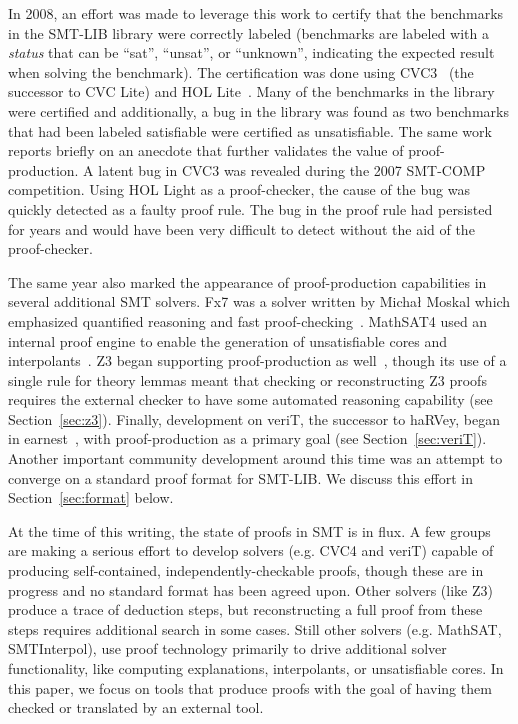 \documentclass{llncs}
\begin{document}
In 2008, an effort was made to leverage this work to certify that the
benchmarks in the SMT-LIB library were correctly labeled (benchmarks are
labeled with a \emph{status} that can be ``sat'', ``unsat'', or ``unknown'',
indicating the expected result when solving the benchmark).  The certification
was done using CVC3~\cite{BT07} (the successor to CVC Lite) and
HOL Lite~\cite{GB08}.  Many of the benchmarks in the library were certified and
additionally, a bug in the library was found as two benchmarks that had been
labeled satisfiable were certified as unsatisfiable.
The same work reports briefly on an anecdote that further validates the value
of proof-production.  A latent bug in CVC3 was revealed during the 2007
SMT-COMP competition.  Using HOL Light as a proof-checker, the cause of the bug
was quickly detected as a faulty proof rule.  The bug in the proof rule had
persisted for years and would have been very difficult to detect without the
aid of the proof-checker.

The same year also marked the appearance of proof-production capabilities in
several additional SMT solvers.  Fx7 was a solver written by Micha{\l} Moskal
which emphasized quantified reasoning and fast proof-checking~\cite{M08}.
MathSAT4 used an internal proof engine to enable the generation of
unsatisfiable cores and interpolants~\cite{BCF+08}.  Z3 began supporting
proof-production as well~\cite{dMB08}, though its use of a single rule for
theory lemmas meant that checking or reconstructing Z3 proofs requires the
external checker to have some automated reasoning capability (see
Section~\ref{sec:z3}).  Finally, development on veriT, the successor to haRVey,
began in earnest~\cite{BdOD+09}, with proof-production as a primary goal (see Section~\ref{sec:veriT}).
Another important community development around this time was an attempt to
converge on a standard proof format for SMT-LIB.  We discuss this effort in
Section~\ref{sec:format} below.

At the time of this writing, the state of proofs in SMT is in flux.  A few
groups are making a serious effort to develop solvers (e.g. CVC4 and veriT)
capable of producing self-contained, independently-checkable proofs, though
these are in progress and no standard format has been agreed upon.  Other
solvers (like Z3) produce a trace of deduction steps, but reconstructing a full
proof from these steps requires additional search in some cases.  Still other
solvers (e.g. MathSAT, SMTInterpol), use proof technology primarily to drive
additional solver functionality, like computing explanations, interpolants, or
unsatisfiable cores.  In this paper, we focus on tools that produce proofs with
the goal of having them checked or translated by an external tool.
\end{document}

